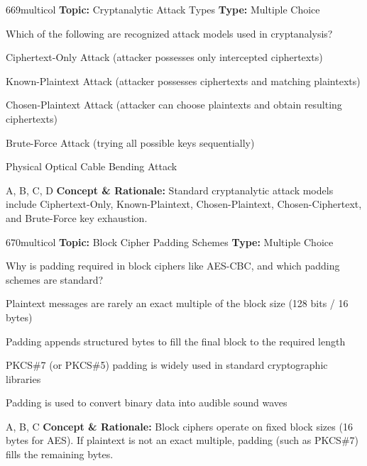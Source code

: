 \begin{qcard}{669}{multicol}
\textcolor{darkslate!75}{\small\textbf{Topic:} Cryptanalytic Attack Types \hfill \textbf{Type:} Multiple Choice}\vspace{0.4em}\par
Which of the following are recognized attack models used in cryptanalysis?
\begin{qoptions}
\item Ciphertext-Only Attack (attacker possesses only intercepted ciphertexts)
\item Known-Plaintext Attack (attacker possesses ciphertexts and matching plaintexts)
\item Chosen-Plaintext Attack (attacker can choose plaintexts and obtain resulting ciphertexts)
\item Brute-Force Attack (trying all possible keys sequentially)
\item Physical Optical Cable Bending Attack
\end{qoptions}
\end{qcard}
\nopagebreak
\begin{explainbox}{A, B, C, D}
\textbf{Concept \& Rationale:} Standard cryptanalytic attack models include Ciphertext-Only, Known-Plaintext, Chosen-Plaintext, Chosen-Ciphertext, and Brute-Force key exhaustion.
\end{explainbox}

\begin{qcard}{670}{multicol}
\textcolor{darkslate!75}{\small\textbf{Topic:} Block Cipher Padding Schemes \hfill \textbf{Type:} Multiple Choice}\vspace{0.4em}\par
Why is padding required in block ciphers like AES-CBC, and which padding schemes are standard?
\begin{qoptions}
\item Plaintext messages are rarely an exact multiple of the block size (128 bits / 16 bytes)
\item Padding appends structured bytes to fill the final block to the required length
\item PKCS\#7 (or PKCS\#5) padding is widely used in standard cryptographic libraries
\item Padding is used to convert binary data into audible sound waves
\end{qoptions}
\end{qcard}
\nopagebreak
\begin{explainbox}{A, B, C}
\textbf{Concept \& Rationale:} Block ciphers operate on fixed block sizes (16 bytes for AES). If plaintext is not an exact multiple, padding (such as PKCS\#7) fills the remaining bytes.
\end{explainbox}

